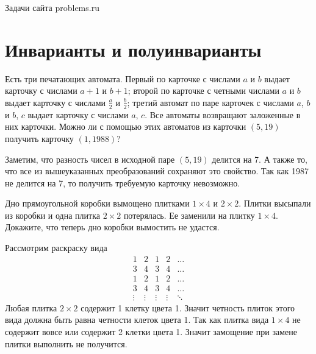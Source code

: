 \documentclass[11pt, a4paper]{template}
\begin{document}
\begin{titlepage}
  \begin{center}
	\Huge{Задачи сайта problems.ru}
  \end{center}
\end{titlepage}

\chapter{Инварианты и полуинварианты}

\begin{exercise}
Есть три печатающих автомата. Первый по карточке с числами $a$ и $b$ выдает карточку с числами $a + 1$ и $b + 1$; второй по карточке с четными числами $a$ и $b$ выдает карточку с числами $\frac{a}{2}$ и $\frac{b}{2}$; третий автомат по паре карточек с числами $a$, $b$ и $b$, $c$ выдает карточку с числами $a$, $c$. Все автоматы возвращают заложенные в них карточки. Можно ли с помощью этих автоматов из карточки $(5, 19)$ получить карточку $(1, 1988)$?
\end{exercise}

\begin{solution}
Заметим, что разность чисел в исходной паре $(5, 19)$ делится на 7. А также то, что все из вышеуказанных преобразований сохраняют это свойство. Так как 1987 не делится на 7, то получить требуемую карточку невозможно. 
\end{solution}

\begin{exercise}
Дно прямоугольной коробки вымощено плитками $1 \times 4$ и $2 \times 2$. Плитки высыпали из коробки и одна плитка $2 \times 2$ потерялась. Ее заменили на плитку $1 \times 4$. Докажите, что теперь дно коробки вымостить не удастся.
\end{exercise}

\begin{solution}
Рассмотрим раскраску вида 
$$
\begin{matrix}
1 & 2 & 1 & 2 & \dots \\
3 & 4 & 3 & 4 & \dots \\
1 & 2 & 1 & 2 & \dots \\
3 & 4 & 3 & 4 & \dots \\
\vdots & \vdots & \vdots & \vdots & \ddots
\end{matrix}
$$
Любая плитка $2 \times 2$ содержит 1 клетку цвета 1. Значит четность плиток этого вида должна быть равна четности клеток цвета 1. Так как плитка вида $1 \times 4$ не содержит вовсе или содержит 2 клетки цвета 1. Значит замощение при замене плитки выполнить не получится.
\end{solution}
\end{document}
